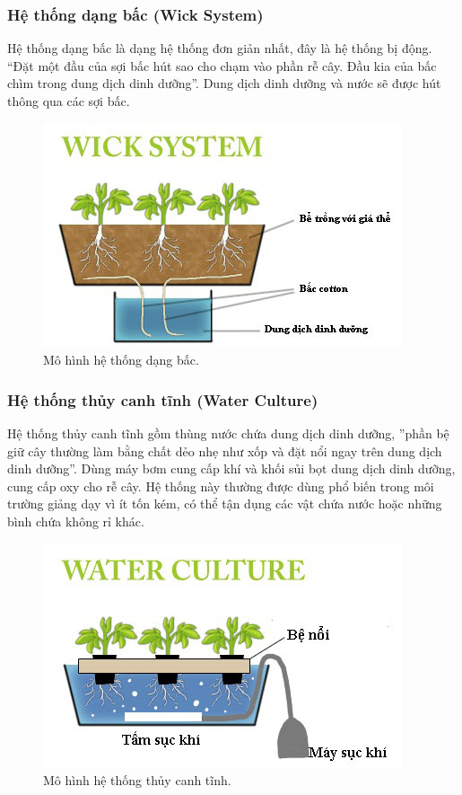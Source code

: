 \documentclass[a4paper,12pt,oneside]{article}
\begin{document}
\subsubsection{Hệ thống dạng bấc (Wick System)}
\noindent Hệ thống dạng bấc là dạng hệ thống đơn giản nhất, đây là hệ thống bị động. “Đặt một đầu của sợi bấc hút sao cho chạm vào phần rễ cây. Đầu kia của bấc chìm trong dung dịch dinh dưỡng”\cite{thuycanh}. Dung dịch dinh dưỡng và nước sẽ được hút thông qua các sợi bấc.

\begin{figure}[H]
	\centering
	\includegraphics[scale=.8]{hinh/Wick_system.jpg}
	\caption{Mô hình hệ thống dạng bấc\cite{thuycanh}.}
	\label{fig:Wick_system}
\end{figure}

\subsubsection{Hệ thống thủy canh tĩnh (Water Culture)}
\noindent Hệ thống thủy canh tĩnh gồm thùng nước chứa dung dịch dinh dưỡng, ”phần bệ giữ cây thường làm bằng chất dẻo nhẹ như xốp và đặt nổi ngay trên dung dịch dinh dưỡng”\cite{thuycanh}. Dùng máy bơm cung cấp khí và khối sủi bọt dung dịch dinh dưỡng, cung cấp oxy cho rễ cây. Hệ thống này thường được dùng phổ biến trong môi trường giảng dạy vì ít tốn kém, có thể tận dụng các vật chứa nước hoặc những bình chứa không rỉ khác.

\begin{figure}[H]
	\centering
	\includegraphics[scale=.8]{hinh/Water_culture.jpg}
	\caption{Mô hình hệ thống thủy canh tĩnh\cite{thuycanh}.}
	\label{fig:Water_culture}
\end{figure}
\end{document}
